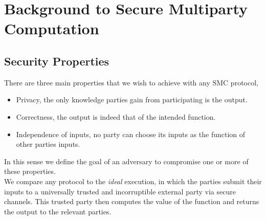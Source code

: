 \documentclass[ %
                    author={Nicholas Tutte},
                supervisor={Prof. Nigel Smart},
                    degree={MEng},
                     title={Secure Two Party Computation},
                  subtitle={A practical comparison of recent protocols},
                      type={Research - GG1K},
                      year={2015} ]{dissertation}
\begin{document}



	\chapter{Background to Secure Multiparty Computation} \label{sec:BG_toSMC}

		\section{Security Properties} \label{sub:SecurityProperties}
			There are three main properties that we wish to achieve with any SMC protocol,
			\begin{itemize}
				\item Privacy, the only knowledge parties gain from participating is the output.
				\item Correctness, the output is indeed that of the intended function.
				\item Independence of inputs, no party can choose its inputs as the function of other parties inputs.
			\end{itemize}

			In this sense we define the goal of an adversary to compromise one or more of these properties.\\

			We compare any protocol to the \emph{ideal} execution, in which the parties submit their inputs to a universally trusted and incorruptible external party via secure channels. This trusted party then computes the value of the function and returns the output to the relevant parties.\\
\end{document}
